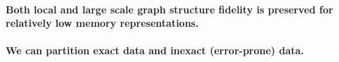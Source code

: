 \documentclass[12pt]{article} \usepackage{simplemargins}
\begin{document}
\begin{figure}
\end{figure}



\paragraph{Both local and large scale graph structure fidelity is preserved for relatively low memory representations.}

\paragraph{We can partition exact data and inexact (error-prone) data.}

\begin{figure}
\end{figure}
\end{document}
